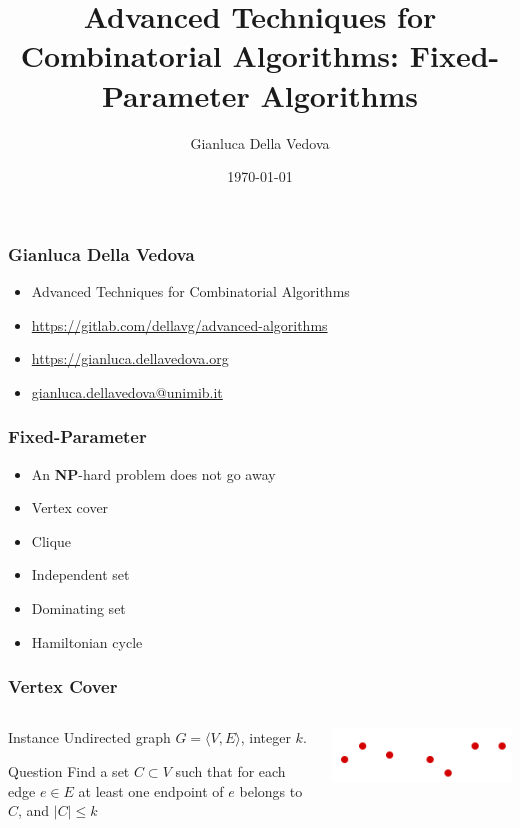 \documentclass[12pt,aspectratio=169]{beamer}
\author{Gianluca Della Vedova}
\title[Advanced Algorithms]{Advanced Techniques for Combinatorial Algorithms:
Fixed-Parameter Algorithms}
\institute[]{Univ. Milano--Bicocca\\
  \texttt{https://gianluca.dellavedova.org}}
\date[]{{\tiny \today\hspace{1em} \vcsShortHash}}
\begin{document}
\begin{frame}
  \titlepage
\end{frame}


\begin{frame}\frametitle{Gianluca Della Vedova}
  \begin{itemize}
  \item
                Advanced Techniques for Combinatorial Algorithms
\item
{\small\url{https://gitlab.com/dellavg/advanced-algorithms}}
  \item
{\small\url{https://gianluca.dellavedova.org}}
  \item
{\small\url{gianluca.dellavedova@unimib.it}}
  \end{itemize}
\end{frame}

\begin{frame}\frametitle{Fixed-Parameter}
  \begin{itemize}
  \item
    An \textbf{NP}-hard problem does not go away
  \item
    Vertex cover
  \item
    Clique
  \item
    Independent set
  \item
    Dominating set
  \item
    Hamiltonian cycle
  \end{itemize}
\end{frame}

\begin{frame}\frametitle{Vertex Cover }
\begin{columns} 
  \begin{column}{0.48\textwidth}
  \begin{block}{Instance}
    Undirected graph $G=\langle V,E \rangle$, integer $k$.
  \end{block}
  \begin{block}{Question}
    Find a set $C\subset V$ such that for each edge $e\in E$ at least one endpoint of $e$
    belongs to $C$, and $|C|\le k$
  \end{block}
\end{column}
    
    \begin{column}{0.48\textwidth}
      \centering

  \includegraphics[height=0.2\textheight]{img/Vertex-cover}
\end{column}
\end{columns}
\end{frame}
\end{document}
